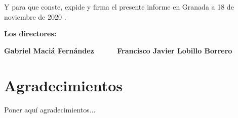 Y para que conste, expide y firma el presente informe en Granada a 18 de noviembre de 2020 .

\vspace{1cm}

\textbf{Los directores:}

\vspace{5cm}

\noindent \textbf{Gabriel Maciá Fernández \ \ \ \ \ Francisco Javier Lobillo Borrero}

\chapter*{Agradecimientos}
\thispagestyle{empty}

       \vspace{1cm}


Poner aquí agradecimientos...


